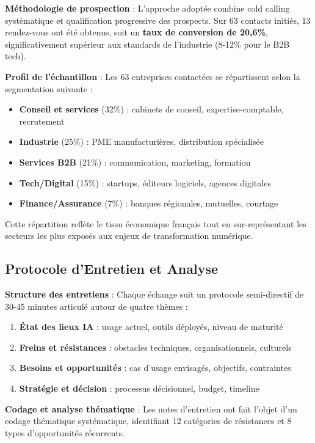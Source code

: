 \textbf{Méthodologie de prospection} : L'approche adoptée combine cold calling systématique et qualification progressive des prospects. Sur 63 contacts initiés, 13 rendez-vous ont été obtenus, soit un \textbf{taux de conversion de 20,6\%}, significativement supérieur aux standards de l'industrie (8-12\% pour le B2B tech).

\textbf{Profil de l'échantillon} : Les 63 entreprises contactées se répartissent selon la segmentation suivante :
\begin{itemize}
    \item \textbf{Conseil et services} (32\%) : cabinets de conseil, expertise-comptable, recrutement
    \item \textbf{Industrie} (25\%) : PME manufacturières, distribution spécialisée
    \item \textbf{Services B2B} (21\%) : communication, marketing, formation
    \item \textbf{Tech/Digital} (15\%) : startups, éditeurs logiciels, agences digitales
    \item \textbf{Finance/Assurance} (7\%) : banques régionales, mutuelles, courtage
\end{itemize}
Cette répartition reflète le tissu économique français tout en sur-représentant les secteurs les plus exposés aux enjeux de transformation numérique.

\subsection{Protocole d'Entretien et Analyse}

\textbf{Structure des entretiens} : Chaque échange suit un protocole semi-directif de 30-45 minutes articulé autour de quatre thèmes :
\begin{enumerate}
    \item \textbf{État des lieux IA} : usage actuel, outils déployés, niveau de maturité
    \item \textbf{Freins et résistances} : obstacles techniques, organisationnels, culturels
    \item \textbf{Besoins et opportunités} : cas d'usage envisagés, objectifs, contraintes
    \item \textbf{Stratégie et décision} : processus décisionnel, budget, timeline
\end{enumerate}

\textbf{Codage et analyse thématique} : Les notes d'entretien ont fait l'objet d'un codage thématique systématique, identifiant 12 catégories de résistances et 8 types d'opportunités récurrents.

